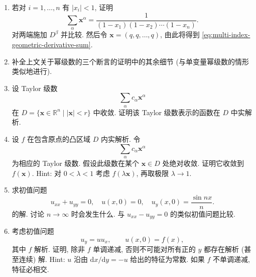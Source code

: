 \begin{enumerate}[label=\thesection.\arabic*.,ref=\thesection.\arabic*,start=7,series=book-problems]

\item\label{ex:multi-index-geometric-series-identity} 若对 $i=1,\ldots,n$ 有 $|x_i|<1$, 证明
\begin{equation}\label{eq:multivariable-geometric-product}
\sum_\alpha\bm{x}^{\alpha}=\dfrac1{(1-x_1)(1-x_2)\cdots(1-x_n)}.
\end{equation}
对两端施加 $D^\beta$ 并比较. 然后令 $\bm{x}=(q,q,\ldots,q)$, 由此将得到 \eqref{eq:multi-index-geometric-derivative-sum}.

\item\label{ex:complete-power-series-facts} 补全上文关于幂级数的三个断言的证明中的其余细节 (与单变量幂级数的情形类似地进行).

\item\label{ex:taylor-series-real-analyticity} 设 Taylor 级数
\begin{equation}\label{eq:exercise-local-taylor-analyticity}
\sum_\alpha c_\alpha\bm{x}^{\alpha}
\end{equation}
在 $D=\{\bm{x}\in\mathbb{R}^n\mid|\bm{x}|<r\}$ 中收敛. 证明该 Taylor 级数表示的函数在 $D$ 中实解析.

\item\label{ex:analytic-taylor-convex-domain} 设 $f$ 在包含原点的凸区域 $D$ 内实解析. 令
\begin{equation}\label{eq:exercise-convex-domain-taylor-series}
\sum_\alpha c_\alpha\bm{x}^{\alpha}
\end{equation}
为相应的 Taylor 级数. 假设此级数在某个 $\bm{x}\in D$ 处绝对收敛. 证明它收敛到 $f(\bm{x})$. Hint: 对 $0<\lambda<1$ 考虑 $f(\lambda\bm{x})$, 再取极限 $\lambda\to1$.

\item\label{ex:elliptic-cauchy-instability} 求初值问题
\begin{equation}\label{eq:elliptic-cauchy-high-frequency-data}
u_{xx}+u_{yy}=0,\quad u(x,0)=0,\quad u_y(x,0)=\dfrac{\sin nx}{n}.
\end{equation}
的解. 讨论 $n\to\infty$ 时会发生什么. 与 $u_{xx}-u_{yy}=0$ 的类似初值问题比较.

\item\label{ex:nonlinear-analytic-breakdown} 考虑初值问题
\begin{equation}\label{eq:nonlinear-cauchy-characteristic-problem}
u_y=uu_x,\qquad u(x,0)=f(x),
\end{equation}
其中 $f$ 解析. 证明, 除非 $f$ 单调递减, 否则不可能对所有正的 $y$ 都存在解析 (甚至连续) 解. Hint: $u$ 沿由 $\mathrm{d}x/\mathrm{d}y=-u$ 给出的特征为常数. 如果 $f$ 不单调递减, 特征必相交.


\end{enumerate}
